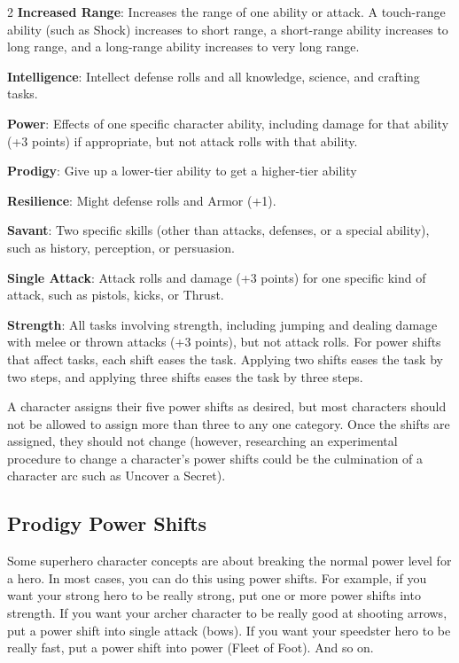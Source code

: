 \begin{multicols}{2}
\textbf{Increased Range}: Increases the range of one ability or attack. A touch-range ability (such as Shock) increases to short range, a short-range ability increases to long range, and a long-range ability increases to very long range.

\textbf{Intelligence}: Intellect defense rolls and all knowledge, science, and crafting tasks.

\textbf{Power}: Effects of one specific character ability, including damage for that ability (+3 points) if appropriate, but not attack rolls with that ability.

\textbf{Prodigy}: Give up a lower-tier ability to get a higher-tier ability

\textbf{Resilience}: Might defense rolls and Armor (+1).

\textbf{Savant}: Two specific skills (other than attacks, defenses, or a special ability), such as history, perception, or persuasion.

\textbf{Single Attack}: Attack rolls and damage (+3 points) for one specific kind of attack, such as pistols, kicks, or Thrust.

\textbf{Strength}: All tasks involving strength, including jumping and dealing damage with melee or thrown attacks (+3 points), but not attack rolls.
For power shifts that affect tasks, each shift eases the task. Applying two shifts eases the task by two steps, and applying three shifts eases the task by three steps.

A character assigns their five power shifts as desired, but most characters should not be allowed to assign more than three to any one category. Once the shifts are assigned, they should not change (however, researching an experimental procedure to change a character’s power shifts could be the culmination of a character arc such as Uncover a Secret).

\subsection{Prodigy Power Shifts}

Some superhero character concepts are about breaking the normal power level for a hero. In most cases, you can do this using power shifts. For example, if you want your strong hero to be really strong, put one or more power shifts into strength. If you want your archer character to be really good at shooting arrows, put a power shift into single attack (bows). If you want your speedster hero to be really fast, put a power shift into power (Fleet of Foot). And so on.


\end{multicols}
